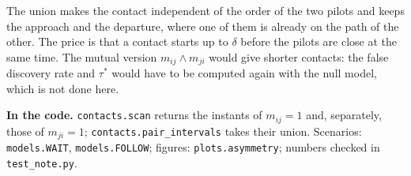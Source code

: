 \documentclass[11pt,a4paper]{article}
\begin{document}
The union makes the contact independent of the order of the two pilots and keeps the approach and
the departure, where one of them is already on the path of the other. The price is that a contact
starts up to $\delta$ before the pilots are close at the same time. The mutual version
$m_{ij}\wedge m_{ji}$ would give shorter contacts: the false discovery rate and $\tau^*$ would have
to be computed again with the null model, which is not done here.

\textbf{In the code.} \texttt{contacts.scan} returns the instants of $m_{ij}=1$ and, separately, those of
$m_{ji}=1$; \texttt{contacts.pair\_\allowbreak intervals} takes their union. Scenarios: \texttt{models.WAIT},
\texttt{models.FOLLOW}; figures: \texttt{plots.asymmetry}; numbers checked in \texttt{test\_note.py}.
\end{document}
